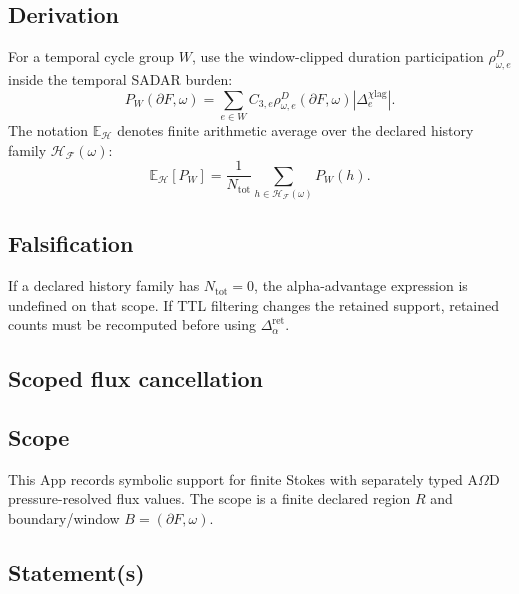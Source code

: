 \subsection{Derivation}
\label{app:stoch-derivation}
For a temporal cycle group \(W\), use the window-clipped duration participation \(\rho^D_{\omega,e}\) inside the temporal SADAR burden:
\[
P_W(\partial F,\omega)
=
\sum_{e\in W}
C_{3,e}
\rho^D_{\omega,e}(\partial F,\omega)
|\Delta^{\chi\mathrm{lag}}_e|.
\]
The notation \(\mathbb E_{\mathcal H}\) denotes finite arithmetic average over the declared history family \(\mathcal H_{\mathcal F}(\omega)\):
\[
\mathbb E_{\mathcal H}[P_W]
=
\frac{1}{N_{\mathrm{tot}}}
\sum_{h\in\mathcal H_{\mathcal F}(\omega)}
P_W(h).
\]

\subsection{Falsification}
\label{app:stoch-falsification}
If a declared history family has \(N_{\mathrm{tot}}=0\), the alpha-advantage expression is undefined on that scope. If TTL filtering changes the retained support, retained counts must be recomputed before using \(\Delta_{\alpha}^{\mathrm{ret}}\).


\subsection{Scoped flux cancellation}
\label{app:scoped-flux-cancellation}
\label{app:symbolic-cancellation-check}

\subsection{Scope}
\label{app:scoped-flux:scope}
This App records symbolic support for finite Stokes with separately typed A\(\Omega\)D pressure-resolved flux values. The scope is a finite declared region \(R\) and boundary/window \(B=(\partial F,\omega)\).

\subsection{Statement(s)}
\label{app:scoped-flux:statements}

